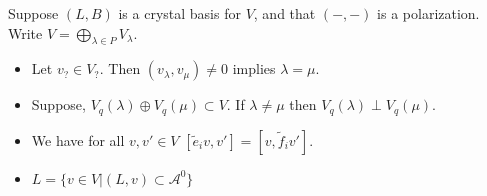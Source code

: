 \documentclass[11pt,fleqn]{article}
\newcommand\A{\mathcal A}
\begin{document}
\begin{Lemma}
\label{polarization-details}
	Suppose $(L,B)$ is a crystal basis for $V$, and that $(-,-)$ is a polarization.
Write $V = \bigoplus_{\lambda \in P} V_\lambda$.
	\begin{itemize}
		\item Let $v_? \in V_?$. Then $(v_\lambda, v_\mu) \neq 0$ implies $\lambda
			= \mu$.
		\item Suppose, $V_q(\lambda) \oplus V_q(\mu) \subset V$. If $\lambda \neq \mu$
			then $V_q(\lambda) \perp V_q(\mu)$.
		\item We have for all $v,v' \in V$ $[\tilde e_i v, v'] = [v, \tilde f_i v']$.
		\item $L = \{v \in V| (L,v) \subset \A^0 \}$
	\end{itemize}
\end{Lemma}
\end{document}

